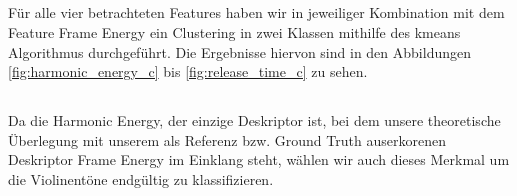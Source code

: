 \subsection{}
Für alle vier betrachteten Features haben wir in jeweiliger Kombination mit dem Feature Frame Energy ein Clustering in zwei Klassen mithilfe des kmeans Algorithmus durchgeführt.
Die Ergebnisse hiervon sind in den Abbildungen \ref{fig:harmonic_energy_c} bis \ref{fig:release_time_c} zu sehen.
%
%
%
%

\subsection{}

Da die Harmonic Energy, der einzige Deskriptor ist, bei dem unsere theoretische Überlegung mit unserem als Referenz bzw. Ground Truth auserkorenen Deskriptor Frame Energy im Einklang steht, wählen wir auch dieses Merkmal um die Violinentöne endgültig zu klassifizieren. 
